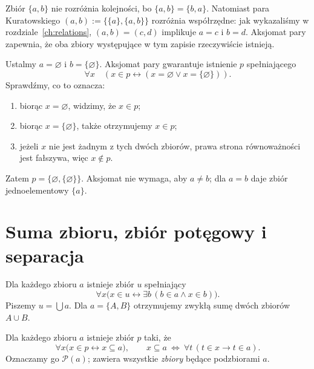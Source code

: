 \begin{przyklad}
Zbiór $\{a,b\}$ nie rozróżnia kolejności, bo $\{a,b\}=\{b,a\}$.
Natomiast para Kuratowskiego
$(a,b):=\{\{a\},\{a,b\}\}$ rozróżnia współrzędne:
jak wykazaliśmy w rozdziale~\ref{ch:relations},
$(a,b)=(c,d)$ implikuje $a=c$ i $b=d$.
Aksjomat pary zapewnia, że oba zbiory występujące w tym zapisie
rzeczywiście istnieją.
\end{przyklad}


\begin{przyklad}
Ustalmy $a=\varnothing$ i $b=\{\varnothing\}$.
Aksjomat pary gwarantuje istnienie $p$ spełniającego
\[
\forall x\quad(x\in p\leftrightarrow
  (x=\varnothing\lor x=\{\varnothing\})).
\]
Sprawdźmy, co to oznacza:
\begin{enumerate}[label=(\roman*)]
\item biorąc $x=\varnothing$, widzimy, że $x\in p$;
\item biorąc $x=\{\varnothing\}$, także otrzymujemy $x\in p$;
\item jeżeli $x$ nie jest żadnym z tych dwóch zbiorów,
      prawa strona równoważności jest fałszywa,
      więc $x\notin p$.
\end{enumerate}
Zatem $p=\{\varnothing,\{\varnothing\}\}$.
Aksjomat nie wymaga, aby $a\ne b$; dla $a=b$
daje zbiór jednoelementowy $\{a\}$.
\end{przyklad}

\section{Suma zbioru, zbiór potęgowy i separacja}
\begin{definicja}\label{def:zf-union}
Dla każdego zbioru $a$ istnieje zbiór $u$ spełniający
\[
\forall x\bigl(x\in u\leftrightarrow
\exists b\,(b\in a\land x\in b)\bigr).
\]
Piszemy $u=\bigcup a$. Dla $a=\{A,B\}$ otrzymujemy
zwykłą sumę dwóch zbiorów $A\cup B$.
\end{definicja}

\begin{definicja}\label{def:zf-power}
Dla każdego zbioru $a$ istnieje zbiór $p$ taki, że
\[
\forall x\bigl(x\in p\leftrightarrow x\subseteq a\bigr),\qquad
x\subseteq a\ \Longleftrightarrow\ \forall t\,(t\in x\to t\in a).
\]
Oznaczamy go $\mathcal P(a)$; zawiera wszystkie \emph{zbiory}
będące podzbiorami $a$.
\end{definicja}


